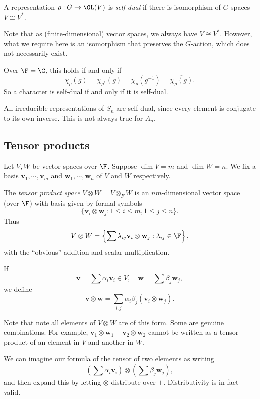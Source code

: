 \documentclass[a4paper]{article}
\begin{document}
\begin{defi}
  A representation $\rho: G \to \GL(V)$ is \emph{self-dual} if there is isomorphism of $G$-spaces $V\cong V^*$.
\end{defi}
Note that as (finite-dimensional) vector spaces, we always have $V \cong V^*$. However, what we require here is an isomorphism that preserves the $G$-action, which does not necessarily exist.

Over $\F = \C$, this holds if and only if
\[
  \chi_\rho(g) = \chi_{\rho^{*}} (g) = \chi_\rho(g^{-1}) = \overline{\chi_\rho(g)}.
\]
So a character is self-dual if and only if it is self-dual.

\begin{eg}
  All irreducible representations of $S_n$ are self-dual, since every element is conjugate to its own inverse. This is not always true for $A_n$.
\end{eg}

\subsection{Tensor products}
\begin{defi}
  Let $V, W$ be vector spaces over $\F$. Suppose $\dim V = m$ and $\dim W = n$. We fix a basis $\mathbf{v}_1, \cdots, \mathbf{v}_m$ and $\mathbf{w}_1, \cdots, \mathbf{w}_n$ of $V$ and $W$ respectively.

  The \emph{tensor product space} $V \otimes W = V\otimes_F W$ is an $nm$-dimensional vector space (over $\F$) with basis given by formal symbols
  \[
    \{\mathbf{v}_i \otimes \mathbf{w}_j: 1\leq i \leq m, 1 \leq j \leq n\}.
  \]
  Thus
  \[
    V\otimes W = \left\{\sum \lambda_{ij} \mathbf{v}_i \otimes \mathbf{w}_j: \lambda_{ij} \in \F\right\},
  \]
  with the ``obvious'' addition and scalar multiplication.

  If
  \[
    \mathbf{v} = \sum \alpha_i \mathbf{v}_i \in V, \quad \mathbf{w} = \sum \beta_j \mathbf{w}_j,
  \]
  we define
  \[
    \mathbf{v} \otimes \mathbf{w} = \sum_{i, j} \alpha_i\beta_j (\mathbf{v}_i \otimes \mathbf{w}_j).
  \]
\end{defi}
Note that note all elements of $V\otimes W$ are of this form. Some are genuine combinations. For example, $\mathbf{v}_1 \otimes \mathbf{w}_1 + \mathbf{v}_2 \otimes \mathbf{w}_2$ cannot be written as a tensor product of an element in $V$ and another in $W$.

We can imagine our formula of the tensor of two elements as writing
\[
  \left(\sum \alpha_i \mathbf{v}_i\right) \otimes \left(\sum \beta_j \mathbf{w}_j\right),
\]
and then expand this by letting $\otimes$ distribute over $+$. Distributivity is in fact valid.
\end{document}
